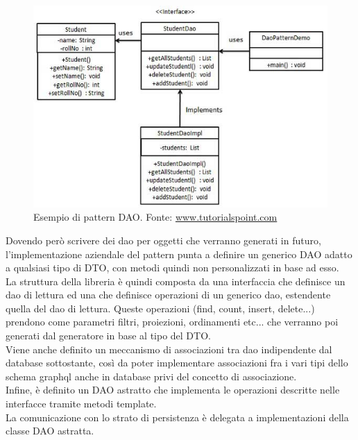 \documentclass[a4paper, 12pt]{scrartcl}
\begin{document}
    \begin{figure}[H]
      \includegraphics[width=\textwidth]{dao_pattern_uml_diagram.jpg}
      \caption{Esempio di pattern DAO. Fonte: \href{https://www.tutorialspoint.com/design_pattern/images/dao_pattern_uml_diagram.jpg}{www.tutorialspoint.com}}
    \end{figure}

    Dovendo però scrivere dei dao per oggetti che verranno generati in futuro, l'implementazione aziendale del pattern punta a definire un generico DAO adatto a qualsiasi tipo di DTO, con metodi quindi non personalizzati in base ad esso.\\
    La struttura della libreria è quindi composta da una interfaccia che definisce un dao di lettura ed una che definisce operazioni di un generico dao, estendente quella del dao di lettura.
    Queste operazioni (find, count, insert, delete...) prendono come parametri filtri, proiezioni, ordinamenti etc... che verranno poi generati dal generatore in base al tipo del DTO.\\

    Viene anche definito un meccanismo di associazioni tra dao indipendente dal database sottostante, così da poter implementare associazioni fra i vari tipi dello schema graphql anche in database privi del concetto di associazione.\\

    Infine, è definito un DAO astratto che implementa le operazioni descritte nelle interfacce tramite metodi template.\\
    La comunicazione con lo strato di persistenza è delegata a implementazioni della classe DAO astratta.\\
  \newpage
\end{document}
